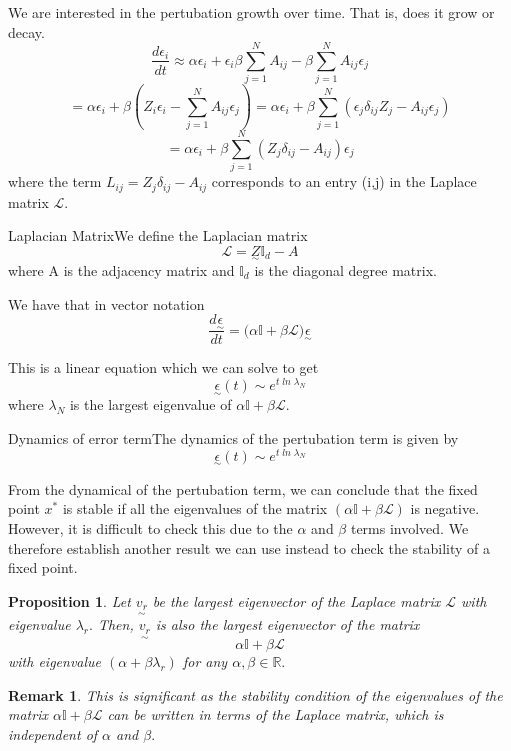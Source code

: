 \documentclass[twoside]{article}
\newcommand{\utilde}{\underset{\sim}}
\newtheorem{proposition}[theorem]{Proposition}
\newtheorem{remark}[theorem]{Remark}
\begin{document}
We are interested in the pertubation growth over time. That is, does it grow or decay.
$$
\frac{d\epsilon_i}{dt} \approx \alpha \epsilon_i + \epsilon_i \beta \sum_{j=1}^{N}A_{ij} - \beta \sum_{j=1}^{N}A_{ij}\epsilon_j
$$
$$
= \alpha \epsilon_i + \beta(Z_i \epsilon_i - \sum_{j=1}^{N}A_{ij}\epsilon_j) = \alpha\epsilon_i + \beta \sum_{j=1}^{N}(\epsilon_j \delta_{ij}Z_j - A_{ij}\epsilon_j)
$$
$$
= \alpha\epsilon_i + \beta \sum_{j=1}^{N}(Z_j\delta_{ij} - A_{ij})\epsilon_j
$$
where the term $L_{ij} = Z_j\delta_{ij} - A_{ij}$ corresponds to an entry (i,j) in the Laplace matrix $\mathcal{L}$.

\begin{definition_exam}{Laplacian Matrix}{}We define the Laplacian matrix 
$$
\mathcal{L} = \utilde{Z}\mathbb{I}_d - A
$$
where A is the adjacency matrix and $\mathbb{I}_d$ is the diagonal degree matrix.
\end{definition_exam}

We have that in vector notation
$$
\frac{d\utilde{\epsilon}}{dt} = \bigg(\alpha \mathbb{I} + \beta \mathcal{L} \bigg)\utilde{\epsilon}
$$

This is a linear equation which we can solve to get 
$$
\utilde{\epsilon}(t) \sim e^{t\; ln\;\lambda_N}
$$
where $\lambda_N$ is the largest eigenvalue of $\alpha \mathbb{I} + \beta \mathcal{L}$.

\begin{proposition_exam}{Dynamics of error term}{}The dynamics of the pertubation term is given by 
$$
\utilde{\epsilon}(t) \sim e^{t\; ln\;\lambda_N}
$$
\end{proposition_exam}

From the dynamical of the pertubation term, we can conclude that the fixed point $x^*$ is stable if all the eigenvalues of the matrix $(\alpha \mathbb{I} + \beta \mathcal{L})$ is negative. However, it is difficult to check this due to the $\alpha$ and $\beta$ terms involved. We therefore establish another result we can use instead to check the stability of a fixed point.

\begin{proposition}Let $\utilde{v_r}$ be the largest eigenvector of the Laplace matrix $\mathcal{L}$ with eigenvalue $\lambda_r.$ Then, $\utilde{v_r}$ is also the largest eigenvector of the matrix 
$$
\alpha \mathbb{I} + \beta \mathcal{L}
$$
with eigenvalue $(\alpha + \beta \lambda_r)$ for any $\alpha, \beta \in \mathbb{R}.$
\end{proposition}

\begin{remark}This is significant as the stability condition of the eigenvalues of the matrix $\alpha \mathbb{I} + \beta \mathcal{L}$ can be written in terms of the Laplace matrix, which is independent of $\alpha$ and $\beta.$
\end{remark}
\end{document}

